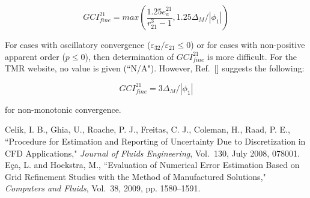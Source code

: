 \documentclass[handcarry]{aiaa-tc-mod}%
\def\ieps{\varepsilon}
\begin{document}
\begin{equation}
GCI_{fine}^{21} = max(\frac{1.25 e_a^{21}}{r_{21}^3 - 1}, 1.25 \Delta_M/ |\phi_1|)
\end{equation}

\noindent For cases with oscillatory convergence ($\ieps_{32}/\ieps_{21} \le 0$)
or for cases with non-positive apparent order ($p \le 0$), then determination of $GCI_{fine}^{21}$
is more difficult.  For the TMR website, no value is given (``N/A").  However, Ref.~[]
suggests the following:

\begin{equation}
GCI_{fine}^{21} = 3 \Delta_M / |\phi_1|
\end{equation}

\noindent for non-monotonic convergence.


%
\begin{thebibliography}{9}%
%
Celik, I. B., Ghia, U., Roache, P. J., Freitas, C. J., Coleman, H., Raad, P. E.,
``Procedure for Estimation and Reporting of Uncertainty Due to Discretization in CFD Applications,"
{\em Journal of Fluids Engineering}, Vol.~130, July 2008, 078001.
%
E\c ca, L. and Hoekstra, M.,
``Evaluation of Numerical Error Estimation Based on Grid Refinement Studies with the Method
of Manufactured Solutions,"
{\em Computers and Fluids}, Vol.~38, 2009, pp. 1580--1591.
\end{thebibliography}
\end{document}
